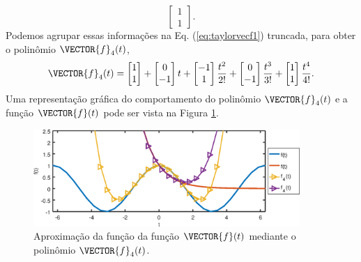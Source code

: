 \begin{SolutionT}
\begin{equation}
\begin{bmatrix}
1\\
1
\end{bmatrix}.
\end{equation}
Podemos agrupar essas informações na Eq. (\ref{eq:taylorvecf1}) truncada, 
para obter o polinômio $\VECTOR{f}_{4}(t)$,
\begin{equation}
\VECTOR{f}_{4}(t)=
\begin{bmatrix}
1\\
1
\end{bmatrix}
+
\begin{bmatrix}
0\\
-1
\end{bmatrix}
t
+
\begin{bmatrix}
-1\\
1
\end{bmatrix}
\frac{t^{2}}{2!}
+
\begin{bmatrix}
0\\
-1
\end{bmatrix}
\frac{t^{3}}{3!}
+
\begin{bmatrix}
1\\
1
\end{bmatrix}
\frac{t^{4}}{4!}.
\end{equation}
Uma representação gráfica do comportamento do polinômio $\VECTOR{f}_{4}(t)$ e a função $\VECTOR{f}(t)$
pode ser vista na Figura \ref{fig:taylorvecf}.
\end{SolutionT}

\begin{figure}[!h]
  \centering
    \includegraphics[width=0.90\textwidth]{chapters/funcoes/mcode/taylorR1R2/taylore.eps}
  \caption{Aproximação da função da função $\VECTOR{f}(t)$ mediante o polinômio $\VECTOR{f}_{4}(t)$.}
    \label{fig:taylorvecf}
\end{figure}

